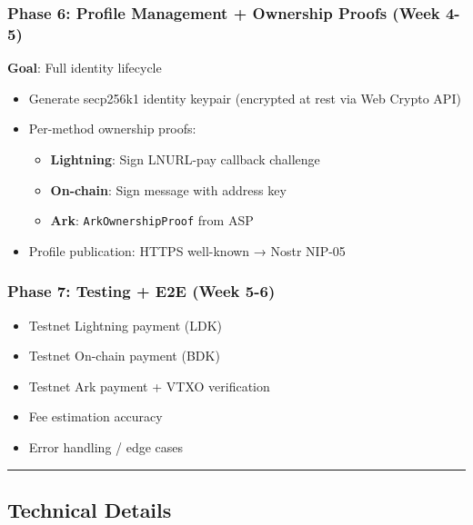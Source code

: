 \documentclass[
]{article}
\providecommand{\tightlist}{%
  \setlength{\itemsep}{0pt}\setlength{\parskip}{0pt}}
\begin{document}
\hypertarget{phase-6-profile-management-ownership-proofs-week-4-5}{%
\subsubsection{Phase 6: Profile Management + Ownership Proofs (Week
4-5)}\label{phase-6-profile-management-ownership-proofs-week-4-5}}

\textbf{Goal}: Full identity lifecycle

\begin{itemize}
\tightlist
\item
  Generate secp256k1 identity keypair (encrypted at rest via Web Crypto
  API)
\item
  Per-method ownership proofs:

  \begin{itemize}
  \tightlist
  \item
    \textbf{Lightning}: Sign LNURL-pay callback challenge
  \item
    \textbf{On-chain}: Sign message with address key
  \item
    \textbf{Ark}: \texttt{ArkOwnershipProof} from ASP
  \end{itemize}
\item
  Profile publication: HTTPS well-known → Nostr NIP-05
\end{itemize}

\hypertarget{phase-7-testing-e2e-week-5-6}{%
\subsubsection{Phase 7: Testing + E2E (Week
5-6)}\label{phase-7-testing-e2e-week-5-6}}

\begin{itemize}
\tightlist
\item
  Testnet Lightning payment (LDK)
\item
  Testnet On-chain payment (BDK)
\item
  Testnet Ark payment + VTXO verification
\item
  Fee estimation accuracy
\item
  Error handling / edge cases
\end{itemize}

\begin{center}\rule{0.5\linewidth}{0.5pt}\end{center}

\hypertarget{technical-details}{%
\subsection{Technical Details}\label{technical-details}}
\end{document}
